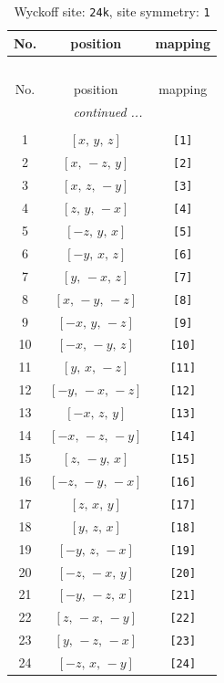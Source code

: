 \documentclass[fleqn,8pt]{jsarticle}
\begin{document}
\begin{longtable}{ccc}
\caption{Wyckoff site: {\tt 24k}, site symmetry: {\tt 1}}
 \\
 \hline \hline
No. & position & mapping \\ \hline \endfirsthead

\multicolumn{2}{l}{\tablename\ \thetable{}} \\
 \hline \hline
No. & position & mapping \\ \hline \endhead

 \hline \hline
\multicolumn{2}{r}{\footnotesize\it continued ...} \\ \endfoot

 \hline \hline
\multicolumn{2}{r}{} \\ \endlastfoot

1 & $\left[ x,\, y,\, z \right]$ & {\tt [1]} \\ \hline
2 & $\left[ x,\, - z,\, y \right]$ & {\tt [2]} \\ \hline
3 & $\left[ x,\, z,\, - y \right]$ & {\tt [3]} \\ \hline
4 & $\left[ z,\, y,\, - x \right]$ & {\tt [4]} \\ \hline
5 & $\left[ - z,\, y,\, x \right]$ & {\tt [5]} \\ \hline
6 & $\left[ - y,\, x,\, z \right]$ & {\tt [6]} \\ \hline
7 & $\left[ y,\, - x,\, z \right]$ & {\tt [7]} \\ \hline
8 & $\left[ x,\, - y,\, - z \right]$ & {\tt [8]} \\ \hline
9 & $\left[ - x,\, y,\, - z \right]$ & {\tt [9]} \\ \hline
10 & $\left[ - x,\, - y,\, z \right]$ & {\tt [10]} \\ \hline
11 & $\left[ y,\, x,\, - z \right]$ & {\tt [11]} \\ \hline
12 & $\left[ - y,\, - x,\, - z \right]$ & {\tt [12]} \\ \hline
13 & $\left[ - x,\, z,\, y \right]$ & {\tt [13]} \\ \hline
14 & $\left[ - x,\, - z,\, - y \right]$ & {\tt [14]} \\ \hline
15 & $\left[ z,\, - y,\, x \right]$ & {\tt [15]} \\ \hline
16 & $\left[ - z,\, - y,\, - x \right]$ & {\tt [16]} \\ \hline
17 & $\left[ z,\, x,\, y \right]$ & {\tt [17]} \\ \hline
18 & $\left[ y,\, z,\, x \right]$ & {\tt [18]} \\ \hline
19 & $\left[ - y,\, z,\, - x \right]$ & {\tt [19]} \\ \hline
20 & $\left[ - z,\, - x,\, y \right]$ & {\tt [20]} \\ \hline
21 & $\left[ - y,\, - z,\, x \right]$ & {\tt [21]} \\ \hline
22 & $\left[ z,\, - x,\, - y \right]$ & {\tt [22]} \\ \hline
23 & $\left[ y,\, - z,\, - x \right]$ & {\tt [23]} \\ \hline
24 & $\left[ - z,\, x,\, - y \right]$ & {\tt [24]} \\
\end{longtable}
\end{document}
